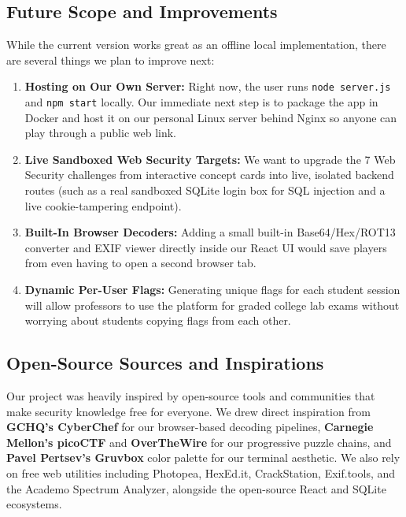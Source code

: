 \documentclass[11pt,a4paper]{article}
\begin{document}
\subsection{Future Scope and Improvements}
While the current version works great as an offline local implementation, there are several things we plan to improve next:
\begin{enumerate}
    \item \textbf{Hosting on Our Own Server:} Right now, the user runs \texttt{node server.js} and \texttt{npm start} locally. Our immediate next step is to package the app in Docker and host it on our personal Linux server behind Nginx so anyone can play through a public web link.
    \item \textbf{Live Sandboxed Web Security Targets:} We want to upgrade the 7 Web Security challenges from interactive concept cards into live, isolated backend routes (such as a real sandboxed SQLite login box for SQL injection and a live cookie-tampering endpoint).
    \item \textbf{Built-In Browser Decoders:} Adding a small built-in Base64/Hex/ROT13 converter and EXIF viewer directly inside our React UI would save players from even having to open a second browser tab.
    \item \textbf{Dynamic Per-User Flags:} Generating unique flags for each student session will allow professors to use the platform for graded college lab exams without worrying about students copying flags from each other.
\end{enumerate}

\subsection{Open-Source Sources and Inspirations}
Our project was heavily inspired by open-source tools and communities that make security knowledge free for everyone. We drew direct inspiration from \textbf{GCHQ's CyberChef} for our browser-based decoding pipelines, \textbf{Carnegie Mellon's picoCTF} and \textbf{OverTheWire} for our progressive puzzle chains, and \textbf{Pavel Pertsev's Gruvbox} color palette for our terminal aesthetic. We also rely on free web utilities including Photopea, HexEd.it, CrackStation, Exif.tools, and the Academo Spectrum Analyzer, alongside the open-source React and SQLite ecosystems.

\clearpage

\end{document}
